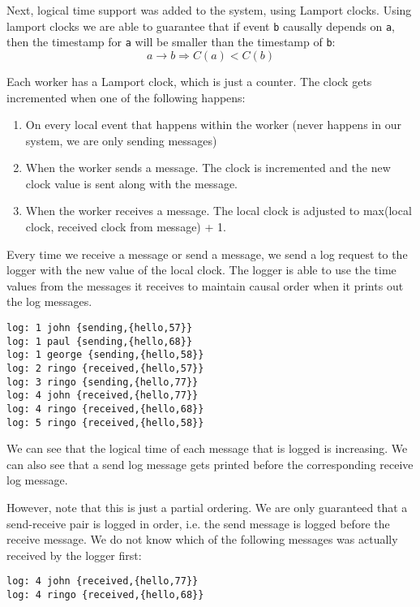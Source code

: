 \documentclass[a4paper, 11pt]{article}
\begin{document}
Next, logical time support was added to the system, using Lamport clocks. Using lamport clocks we are able to guarantee that if event \texttt{b} causally depends on \texttt{a}, then the timestamp for \texttt{a} will be smaller than the timestamp of \texttt{b}: 
\[ a \rightarrow b \Rightarrow C(a)<C(b) \]

Each worker has a Lamport clock, which is just a counter. The clock gets incremented when one of the following happens:

\begin{enumerate}
\item On every local event that happens within the worker (never happens in our system, we are only sending messages)
\item When the worker sends a message. The clock is incremented and the new clock value is sent along with the message.
\item When the worker receives a message. The local clock is adjusted to max(local clock, received clock from message) + 1.
\end{enumerate}

Every time we receive a message or send a message, we send a log request to the logger with the new value of the local clock. The logger is able to use the time values from the messages it receives to maintain causal order when it prints out the log messages.

\begin{verbatim}
log: 1 john {sending,{hello,57}}
log: 1 paul {sending,{hello,68}}
log: 1 george {sending,{hello,58}}
log: 2 ringo {received,{hello,57}}
log: 3 ringo {sending,{hello,77}}
log: 4 john {received,{hello,77}}
log: 4 ringo {received,{hello,68}}
log: 5 ringo {received,{hello,58}}
\end{verbatim}

We can see that the logical time of each message that is logged is increasing. We can also see that a send log message gets printed before the corresponding receive log message.

However, note that this is just a partial ordering. We are only guaranteed that a send-receive pair is logged in order, i.e. the send message is logged before the receive message. We do not know which of the following messages was actually received by the logger first:

\begin{verbatim}
log: 4 john {received,{hello,77}}
log: 4 ringo {received,{hello,68}}
\end{verbatim}
\end{document}
